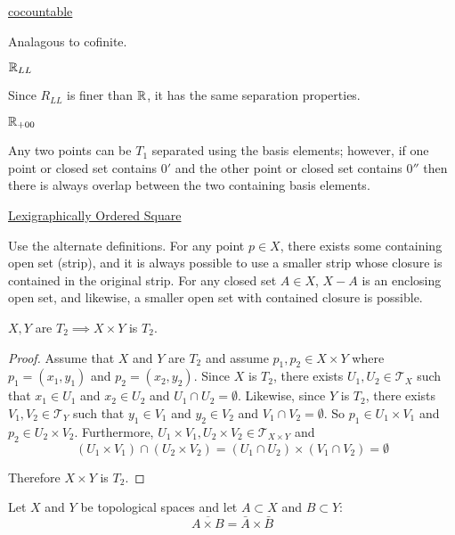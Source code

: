 \documentclass[letterpaper,12pt,fleqn]{article}
\newcommand{\T}{\mathscr{T}}
\begin{document}
\begin{example}[Exercise 4.13]
  \underline{cocountable}

  Analagous to cofinite.

  \underline{\(\mathbb{R}_{LL}\)}

  Since \(R_{LL}\) is finer than \(\mathbb{R}\), it has the same separation properties.

  \underline{\(\mathbb{R}_{+00}\)}

  Any two points can be \(T_1\) separated using the basis elements; however, if one point or closed set contains
  \(0'\) and the other point or closed set contains \(0''\) then there is always overlap between the two containing
  basis elements.

  \underline{Lexigraphically Ordered Square}

  Use the alternate definitions.  For any point \(p\in X\), there exists some containing open set (strip), and it is
  always possible to use a smaller strip whose closure is contained in the original strip.  For any closed set
  \(A\in X\), \(X-A\) is an enclosing open set, and likewise, a smaller open set with contained closure is possible.
\end{example}

\begin{theorem}[4.16]
  \(X,Y\) are \(T_2\implies X\times Y\) is \(T_2\).
\end{theorem}

\begin{proof}
  Assume that \(X\) and \(Y\) are \(T_2\) and assume \(p_1,p_2\in X\times Y\) where \(p_1=(x_1,y_1)\) and
  \(p_2=(x_2,y_2)\).  Since \(X\) is \(T_2\), there exists \(U_1,U_2\in\T_X\) such that \(x_1\in U_1\) and
  \(x_2\in U_2\) and \(U_1\cap U_2=\emptyset\).  Likewise, since \(Y\) is \(T_2\), there exists \(V_1,V_2\in\T_Y\)
  such that \(y_1\in V_1\) and \(y_2\in V_2\) and \(V_1\cap V_2=\emptyset\).  So \(p_1\in U_1\times V_1\) and
  \(p_2\in U_2\times V_2\).  Furthermore, \(U_1\times V_1,U_2\times V_2\in\T_{X\times Y}\) and
  \[(U_1\times V_1)\cap(U_2\times V_2)=(U_1\cap U_2)\times(V_1\cap V_2)=\emptyset\]

  Therefore \(X\times Y\) is \(T_2\).
\end{proof}

\begin{lemma}
  Let \(X\) and \(Y\) be topological spaces and let \(A\subset X\) and \(B\subset Y\):
  \[\overline{A\times B}=\bar{A}\times\bar{B}\]
\end{lemma}
\end{document}
